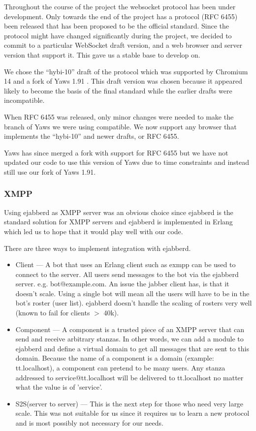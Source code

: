 \documentclass[11pt,a4paper]{report}
\begin{document}
Throughout the course of the project the websocket protocol has
been under development. Only towards the end of the project has a protocol
(RFC 6455) been released that has been proposed to be the official standard.
Since the protocol might have changed significantly during the project, we
decided to commit to a particular WebSocket draft version, and a web browser and
server version that support it. This gave us a stable base to develop on.

We chose the ``hybi-10'' draft of the protocol \cite{hybi-10} which was
supported by Chromium 14 and a fork of Yaws 1.91 \cite{yaws-fork}. This draft
version was chosen because it appeared likely to become the basis of the final
standard \cite{new-websocket-google-blog} while the earlier drafts were
incompatible.

When RFC 6455 was released, only minor changes were needed to make the branch of
Yaws we were using compatible. We now support any browser that implements
the ``hybi-10'' and newer drafts, or RFC 6455.

Yaws has since merged a fork with support for RFC 6455 but we have not updated
our code to use this version of Yaws due to time constraints and instead still
use our fork of Yaws 1.91\cite{our-yaws}.


\subsubsection{XMPP}
Using ejabberd as XMPP server was an obvious choice since ejabberd is the
standard solution for XMPP servers and ejabberd is implemented
in Erlang which led us to hope that it would play well with our code.

There are three ways to implement integration with ejabberd.

\begin{itemize}
\item Client --- A bot that uses an Erlang client such as exmpp can be used to
connect to the server.
All users send messages to the bot via the ejabberd server. e.g. bot@example.com.
An issue the jabber client has, is that it doesn’t scale. Using a single bot
will mean all the users will have to be in the bot’s roster (user list).
ejabberd doesn’t handle the scaling of rosters very well (known to fail for
clients $>$ 40k).
\item Component --- A component is a trusted piece of an XMPP server that can send
and receive arbitrary stanzas.
In other words, we can add a module to ejabberd and define a virtual domain to
get all messages that are sent to this domain.
Because the name of a component is a domain (example: tt.localhost), a component
can pretend to be many users.
Any stanza addressed to service@tt.localhost will be delivered to tt.localhost
no matter what the value is of 'service'.
\item S2S(server to server) --- This is the next step for those who need very
large scale. This was not suitable for us since it requires us to learn a new
protocol and is most possibly not necessary for our needs.
\end{itemize}
\end{document}
